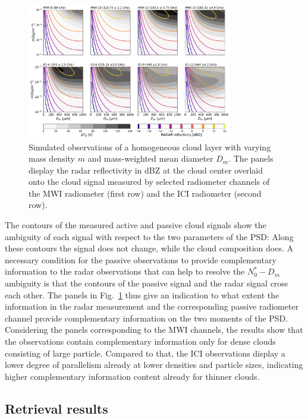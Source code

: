 \documentclass[journal abbreviation, manuscript]{copernicus}
\begin{document}
\begin{figure}
\centering
\includegraphics[width = 0.8\textwidth]{../plots/contours}
\caption{Simulated observations of a homogeneous cloud layer with
varying mass density $m$ and mass-weighted mean diameter $D_m$. The panels
display the radar reflectivity in dBZ at the cloud center overlaid onto the
cloud signal measured by selected radiometer channels of the MWI radiometer
(first row) and the ICI radiometer (second row).}
\label{fig:isolines}
\end{figure}

The contours of the measured active and passive cloud signals show the ambiguity
of each signal with respect to the two parameters of the PSD: Along these
contours the signal does not change, while the cloud composition does. A
necessary condition for the passive observations to provide complementary
information to the radar observations that can help to resolve the $N_0^*-D_m$
ambiguity is that the contours of the passive signal and the radar signal cross
each other. The panels in Fig.~\ref{fig:isolines} thus give an indication to
what extent the information in the radar measurement and the corresponding
passive radiometer channel provide complementary information on the two moments
of the PSD. Considering the panels corresponding to the MWI channels, the
results show that the observations contain complementary information only for
dense clouds consisting of large particle. Compared to that, the ICI
observations display a lower degree of parallelism already at lower densities
and particle sizes, indicating higher complementary information content already
for thinner clouds.

\subsection{Retrieval results}
\end{document}
